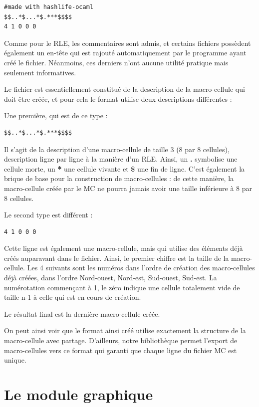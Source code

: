 \documentclass[a4paper,12pt]{report}
\begin{document}
\begin{verbatim}
#made with hashlife-ocaml
$$..*$...*$.***$$$$
4 1 0 0 0
\end{verbatim}

Comme pour le RLE, les commentaires sont admis, et certains fichiers possèdent
également un en-tête qui est rajouté automatiquement par le programme ayant créé
le fichier. Néanmoins, ces derniers n'ont aucune utilité pratique mais seulement
informatives.

Le fichier est essentiellement constitué de la description de la macro-cellule
qui doit être créée, et pour cela le format utilise deux descriptions
différentes :

Une première, qui est de ce type :
\begin{verbatim}
$$..*$...*$.***$$$$
\end{verbatim}
Il s'agit de la description d'une macro-cellule de taille 3 (8 par 8 cellules),
description ligne par ligne à la manière d'un RLE. Ainsi, un \textbf{.}
symbolise une cellule morte, un \textbf{*} une cellule vivante et \textbf{\$}
une fin de ligne. C'est également la brique de base pour la construction de
macro-cellules : de cette manière, la macro-cellule créée par le MC ne pourra
jamais avoir une taille inférieure à 8 par 8 cellules.

Le second type est différent : 
\begin{verbatim}
4 1 0 0 0
\end{verbatim}
Cette ligne est également une macro-cellule, mais qui utilise des éléments déjà
créés auparavant dans le fichier. Ainsi, le premier chiffre est la taille de la
macro-cellule. Les 4 suivants sont les numéros dans l'ordre de création des
macro-cellules déjà créées, dans l'ordre Nord-ouest, Nord-est, Sud-ouest,
Sud-est. La numérotation commençant à 1, le zéro indique une cellule totalement
vide de taille n-1 à celle qui est en cours de création.

Le résultat final est la dernière macro-cellule créée.

\medskip

On peut ainsi voir que le format ainsi créé utilise exactement la structure de
la macro-cellule avec partage. D'ailleurs, notre bibliothèque permet l'export de
macro-cellules vers ce format qui garanti que chaque ligne du fichier MC est
unique.

\section{Le module graphique}
\end{document}
